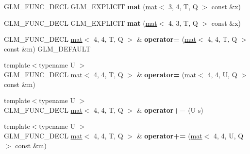 \begin{DoxyCompactItemize}
G\+L\+M\+\_\+\+F\+U\+N\+C\+\_\+\+D\+E\+CL G\+L\+M\+\_\+\+E\+X\+P\+L\+I\+C\+IT {\bfseries mat} (\hyperlink{structglm_1_1mat}{mat}$<$ 3, 4, T, Q $>$ const \&x)
\item 
\mbox{\label{structglm_1_1mat_3_014_00_014_00_01T_00_01Q_01_4_af00f939ac056ea78b8986e55bc121a70}} 
G\+L\+M\+\_\+\+F\+U\+N\+C\+\_\+\+D\+E\+CL G\+L\+M\+\_\+\+E\+X\+P\+L\+I\+C\+IT {\bfseries mat} (\hyperlink{structglm_1_1mat}{mat}$<$ 4, 3, T, Q $>$ const \&x)
\item 
\mbox{\label{structglm_1_1mat_3_014_00_014_00_01T_00_01Q_01_4_aa64e74b5eb65bcaece3310f4f7b67284}} 
G\+L\+M\+\_\+\+F\+U\+N\+C\+\_\+\+D\+E\+CL \hyperlink{structglm_1_1mat}{mat}$<$ 4, 4, T, Q $>$ \& {\bfseries operator=} (\hyperlink{structglm_1_1mat}{mat}$<$ 4, 4, T, Q $>$ const \&m) G\+L\+M\+\_\+\+D\+E\+F\+A\+U\+LT
\item 
\mbox{\label{structglm_1_1mat_3_014_00_014_00_01T_00_01Q_01_4_a62fa4a722a8cf4b3c8fb76d4e865316d}} 
{\footnotesize template$<$typename U $>$ }\\G\+L\+M\+\_\+\+F\+U\+N\+C\+\_\+\+D\+E\+CL \hyperlink{structglm_1_1mat}{mat}$<$ 4, 4, T, Q $>$ \& {\bfseries operator=} (\hyperlink{structglm_1_1mat}{mat}$<$ 4, 4, U, Q $>$ const \&m)
\item 
\mbox{\label{structglm_1_1mat_3_014_00_014_00_01T_00_01Q_01_4_a0f815cdd7d2c4c961195e562a57b588b}} 
{\footnotesize template$<$typename U $>$ }\\G\+L\+M\+\_\+\+F\+U\+N\+C\+\_\+\+D\+E\+CL \hyperlink{structglm_1_1mat}{mat}$<$ 4, 4, T, Q $>$ \& {\bfseries operator+=} (U s)
\item 
\mbox{\label{structglm_1_1mat_3_014_00_014_00_01T_00_01Q_01_4_adcd94cc67c06e39342acf446e1859b52}} 
{\footnotesize template$<$typename U $>$ }\\G\+L\+M\+\_\+\+F\+U\+N\+C\+\_\+\+D\+E\+CL \hyperlink{structglm_1_1mat}{mat}$<$ 4, 4, T, Q $>$ \& {\bfseries operator+=} (\hyperlink{structglm_1_1mat}{mat}$<$ 4, 4, U, Q $>$ const \&m)
\item 
\mbox{\label{structglm_1_1mat_3_014_00_014_00_01T_00_01Q_01_4_ae97fef5ac1d3b3b1b51ab496c7c02877}} 

\end{DoxyCompactItemize}
